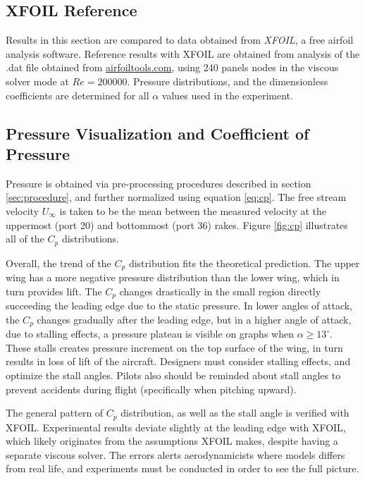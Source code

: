 \documentclass[runningheads]{llncs}
\begin{document}
\subsection{XFOIL Reference}

\noindent
Results in this section are compared to data obtained from \textit{XFOIL}, a free airfoil analysis software. Reference results with XFOIL are obtained from analysis of the .dat file obtained from \href{http://airfoiltools.com/airfoil/details?airfoil=clarky-il}{airfoiltools.com}, using 240 panels nodes in the viscous solver mode at $Re = 200000$. Pressure distributions, and the dimensionless coefficients are determined for all $\alpha$ values used in the experiment.\newline

\subsection{Pressure Visualization and Coefficient of Pressure}

\noindent
Pressure is obtained via pre-processing procedures described in section \ref{sec:procedure}, and further normalized using equation \ref{eq:cp}. The free stream velocity $U_\infty$ is taken to be the mean between the measured velocity at the uppermost (port 20) and bottommost (port 36) rakes. Figure \ref{fig:cp} illustrates all of the $C_p$ distributions. \newline

\noindent
Overall, the trend of the $C_p$ distribution fits the theoretical prediction. The upper wing has a more negative pressure distribution than the lower wing, which in turn provides lift. The $C_p$ changes drastically in the small region directly succeeding the leading edge due to the static pressure. In lower angles of attack, the $C_p$ changes gradually after the leading edge, but in a higher angle of attack, due to stalling effects, a pressure plateau is visible on graphs when $\alpha \ge 13^\circ$. These stalls creates pressure increment on the top surface of the wing, in turn results in loss of lift of the aircraft. Designers must consider stalling effects, and optimize the stall angles. Pilots also should be reminded about stall angles to prevent accidents during flight (specifically when pitching upward). \newline

\noindent
The general pattern of $C_p$ distribution, as well as the stall angle is verified with XFOIL. Experimental results deviate slightly at the leading edge with XFOIL, which likely originates from the assumptions XFOIL makes, despite having a separate viscous solver. The errors alerts aerodynamicists where models differs from real life, and experiments must be conducted in order to see the full picture.
\end{document}
